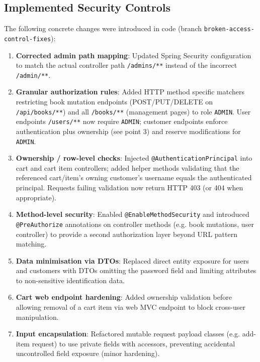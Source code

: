 \documentclass[]{UCD_CS_FYP_Report}
\begin{document}
\subsection{Implemented Security Controls}
The following concrete changes were introduced in code (branch \texttt{broken-access-control-fixes}):
\begin{enumerate}
	\item \textbf{Corrected admin path mapping}: Updated Spring Security configuration to match the actual controller path \texttt{/admins/**} instead of the incorrect \texttt{/admin/**}.
	\item \textbf{Granular authorization rules}: Added HTTP method specific matchers restricting book mutation endpoints (POST/PUT/DELETE on \texttt{/api/books/**}) and all \texttt{/books/**} (management pages) to role \texttt{ADMIN}. User endpoints \texttt{/users/**} now require \texttt{ADMIN}; customer endpoints enforce authentication plus ownership (see point 3) and reserve modifications for \texttt{ADMIN}.
	\item \textbf{Ownership / row-level checks}: Injected \texttt{@AuthenticationPrincipal} into cart and cart item controllers; added helper methods validating that the referenced cart/item's owning customer's username equals the authenticated principal. Requests failing validation now return HTTP 403 (or 404 when appropriate).
	\item \textbf{Method-level security}: Enabled \texttt{@EnableMethodSecurity} and introduced \texttt{@PreAuthorize} annotations on controller methods (e.g. book mutations, user controller) to provide a second authorization layer beyond URL pattern matching.
	\item \textbf{Data minimisation via DTOs}: Replaced direct entity exposure for users and customers with DTOs omitting the password field and limiting attributes to non-sensitive identification data.
	\item \textbf{Cart web endpoint hardening}: Added ownership validation before allowing removal of a cart item via web MVC endpoint to block cross-user manipulation.
	\item \textbf{Input encapsulation}: Refactored mutable request payload classes (e.g. add-item request) to use private fields with accessors, preventing accidental uncontrolled field exposure (minor hardening).
\end{enumerate}
\end{document}
